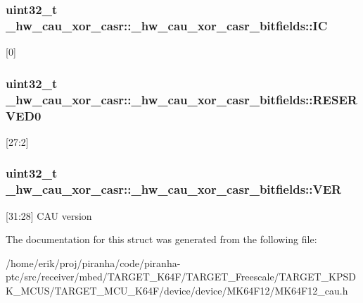 \subsubsection[{\texorpdfstring{IC}{IC}}]{\setlength{\rightskip}{0pt plus 5cm}uint32\+\_\+t \+\_\+hw\+\_\+cau\+\_\+xor\+\_\+casr\+::\+\_\+hw\+\_\+cau\+\_\+xor\+\_\+casr\+\_\+bitfields\+::\+IC}\hypertarget{struct__hw__cau__xor__casr_1_1__hw__cau__xor__casr__bitfields_a72892ab9fab4ed61cd79bfe7de31dbc8}{}\label{struct__hw__cau__xor__casr_1_1__hw__cau__xor__casr__bitfields_a72892ab9fab4ed61cd79bfe7de31dbc8}
\mbox{[}0\mbox{]} 
\subsubsection[{\texorpdfstring{R\+E\+S\+E\+R\+V\+E\+D0}{RESERVED0}}]{\setlength{\rightskip}{0pt plus 5cm}uint32\+\_\+t \+\_\+hw\+\_\+cau\+\_\+xor\+\_\+casr\+::\+\_\+hw\+\_\+cau\+\_\+xor\+\_\+casr\+\_\+bitfields\+::\+R\+E\+S\+E\+R\+V\+E\+D0}\hypertarget{struct__hw__cau__xor__casr_1_1__hw__cau__xor__casr__bitfields_ad5e76b66f511a8bce71c5151aa484f57}{}\label{struct__hw__cau__xor__casr_1_1__hw__cau__xor__casr__bitfields_ad5e76b66f511a8bce71c5151aa484f57}
\mbox{[}27\+:2\mbox{]} 
\subsubsection[{\texorpdfstring{V\+ER}{VER}}]{\setlength{\rightskip}{0pt plus 5cm}uint32\+\_\+t \+\_\+hw\+\_\+cau\+\_\+xor\+\_\+casr\+::\+\_\+hw\+\_\+cau\+\_\+xor\+\_\+casr\+\_\+bitfields\+::\+V\+ER}\hypertarget{struct__hw__cau__xor__casr_1_1__hw__cau__xor__casr__bitfields_a6086132fec6a812ecb65a4b0fd39f689}{}\label{struct__hw__cau__xor__casr_1_1__hw__cau__xor__casr__bitfields_a6086132fec6a812ecb65a4b0fd39f689}
\mbox{[}31\+:28\mbox{]} C\+AU version 

The documentation for this struct was generated from the following file\+:\begin{DoxyCompactItemize}
\item 
/home/erik/proj/piranha/code/piranha-\/ptc/src/receiver/mbed/\+T\+A\+R\+G\+E\+T\+\_\+\+K64\+F/\+T\+A\+R\+G\+E\+T\+\_\+\+Freescale/\+T\+A\+R\+G\+E\+T\+\_\+\+K\+P\+S\+D\+K\+\_\+\+M\+C\+U\+S/\+T\+A\+R\+G\+E\+T\+\_\+\+M\+C\+U\+\_\+\+K64\+F/device/device/\+M\+K64\+F12/M\+K64\+F12\+\_\+cau.\+h\end{DoxyCompactItemize}
